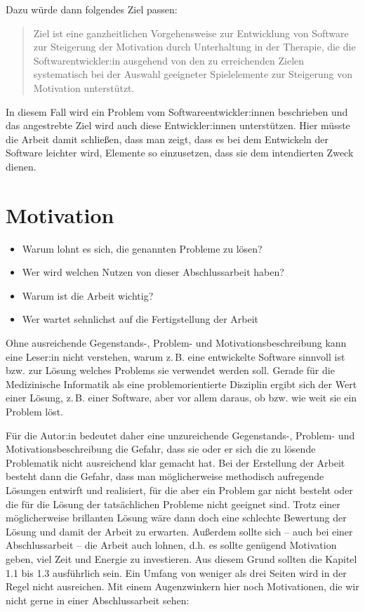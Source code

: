 \begin{temp}
Dazu würde dann folgendes Ziel passen:
\blockquote{Ziel ist eine ganzheitlichen Vorgehensweise zur Entwicklung von Software zur Steigerung der Motivation durch Unterhaltung in der Therapie, die die Softwarentwickler:in ausgehend von den zu erreichenden Zielen systematisch bei der Auswahl geeigneter Spielelemente zur Steigerung von Motivation unterstützt.}
In diesem Fall wird ein Problem vom Softwareentwickler:innen beschrieben und das angestrebte Ziel wird auch diese Entwickler:innen unterstützen.
Hier müsste die Arbeit damit schließen, dass man zeigt, dass es bei dem Entwickeln der Software leichter wird, Elemente so einzusetzen, dass sie dem intendierten Zweck dienen.

\section{Motivation}

\begin{itemize}
\item Warum lohnt es sich, die genannten Probleme zu lösen?
\item Wer wird welchen Nutzen von dieser Abschlussarbeit haben?
\item Warum ist die Arbeit wichtig?
\item Wer wartet sehnlichst auf die Fertigstellung der Arbeit
\end{itemize}

Ohne ausreichende Gegenstands-, Problem- und Motivationsbeschreibung kann eine Leser:in nicht verstehen, warum z.\,B. eine entwickelte Software sinnvoll ist bzw. zur Lösung welches Problems sie verwendet werden soll.
Gerade für die Medizinische Informatik als eine problemorientierte Disziplin ergibt sich der Wert einer Lösung, z.\,B. einer Software, aber vor allem daraus, ob bzw. wie weit sie ein Problem löst.

Für die Autor:in bedeutet daher eine unzureichende Gegenstands-, Problem- und Motivationsbeschreibung die Gefahr, dass sie oder er sich die zu lösende Problematik nicht ausreichend klar gemacht hat.
Bei der Erstellung der Arbeit besteht dann die Gefahr, dass man möglicherweise methodisch aufregende Lösungen entwirft und realisiert, für die aber ein Problem gar nicht besteht oder die für die Lösung der tatsächlichen Probleme nicht geeignet sind.
Trotz einer möglicherweise brillanten Lösung wäre dann doch eine schlechte Bewertung der Lösung und damit der Arbeit zu erwarten.
Außerdem sollte sich -- auch bei einer Abschlussarbeit -- die Arbeit auch lohnen, d.h. es sollte genügend Motivation geben, viel Zeit und Energie zu investieren.
Aus diesem Grund sollten die Kapitel 1.1 bis 1.3 ausführlich sein.
Ein Umfang von weniger als drei Seiten wird in der Regel nicht ausreichen.
Mit einem Augenzwinkern hier noch Motivationen, die wir nicht gerne in einer Abschlussarbeit sehen:\\
~~\\


\end{temp}
